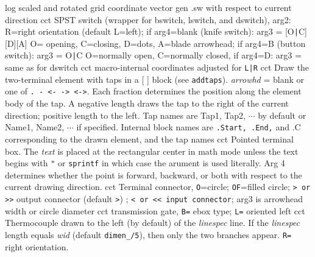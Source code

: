   {log}
  {scaled and rotated grid coordinate vector}
  {gen}
  {.sw with respect to current direction}
  {cct}
  {SPST switch (wrapper for bswitch, lswitch, and dswitch),
    arg2: R=right orientation (default L=left);
     if arg4=blank (knife switch): arg3 = [O{\tt|}C][D][A]
       O= opening, C=closing, D=dots, A=blade arrowhead;
     if arg4=B (button switch): arg3 = O{\tt|}C
       O=normally open, C=normally closed,
     if arg4=D: arg3 = same as for dswitch }
%
  {cct}
  {macro-internal coordinates adjusted for {\tt L|R}}
  {cct}
  {Draw the two-terminal element with taps in a [ ] block (see {\tt addtaps}).
   {\sl arrowhd} = blank or one of {\tt . - <- -> <->}.
   Each fraction determines the position along the element body of the tap.
   A negative length draws the tap to the right of the current
   direction; positive length to the left.
   Tap names are Tap1, Tap2, $\cdots$ by default  or
   Name1, Name2, $\cdots$ if specified.
   Internal block names are {\tt .Start, .End,} and {.C} corresponding to the
   drawn element, and the tap names 
    }
  {cct}
  {Pointed terminal box. The {\sl text} is placed at the rectangular center
   in math mode unless the text begins with {\tt "} or {\tt sprintf} in which
   case the arument is used literally.  Arg 4 determines whether the point is
   forward, backward, or both with respect to the current drawing direction.
    }
  {cct}
  {Terminal connector, {\tt O}=circle; {\tt OF}=filled circle;
   {\tt > or >>} output connector
   (default {\tt >}) ;
   {\tt < or << input connector}; arg3 is arrowhead width or circle diameter 
    }
  {cct}
  {transmission gate, {\tt B=} ebox type; {\tt L=} oriented left
    }
  {cct}
  { Thermocouple drawn to the left (by default) of the {\sl linespec}
    line.  If the {\sl linespec} length equals {\sl wid}
    (default {\tt dimen\_/5}), then only the two branches appear. 
    {\tt R=} right orientation.
    }
